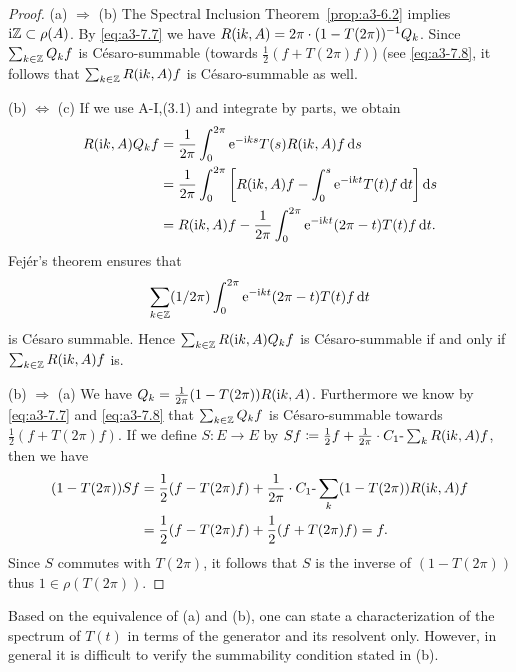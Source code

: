 \begin{proof}
(a) $\Rightarrow$ (b) The Spectral Inclusion Theorem~\ref{prop:a3-6.2} implies $\mathrm{i}\mathbb{Z} \subset \rho(A)$.
By \eqref{eq:a3-7.7} we have $R(\mathrm{i} k,A) = 2\pi\cdot(1-T(2\pi))^{-1}Q_{k}$.
Since $\sum_{k\in\mathbb{Z}} Q_{k}f$ is Césaro-summable (towards $\frac{1}{2}(f + T(2\pi)f)$) (see \eqref{eq:a3-7.8}, it follows that $\sum_{k\in\mathbb{Z}} R(\mathrm{i} k,A)f$ is Césaro-summable as well.

(b) $\Leftrightarrow$ (c) If we use A-I,(3.1) and integrate by parts, we obtain
\begin{align*}
R(\mathrm{i} k,A)Q_{k}f &= \frac{1}{2\pi}\int_{0}^{2\pi} \mathrm{e}^{-\mathrm{i} ks} T(s)R(\mathrm{i} k,A)f \mathop{}\!\mathrm{d}{s} \\
&= \frac{1}{2\pi}\int_{0}^{2\pi} \left[R(\mathrm{i} k,A)f - \int_{0}^{s} \mathrm{e}^{-\mathrm{i} kt} T(t)f \mathop{}\!\mathrm{d}{t}\right] \mathop{}\!\mathrm{d}{s} \\
&= R(\mathrm{i} k,A)f - \frac{1}{2\pi}\int_{0}^{2\pi} \mathrm{e}^{-\mathrm{i} kt} (2\pi-t) T(t)f \mathop{}\!\mathrm{d}{t} .
\end{align*}
Fejér's theorem ensures that 
%
\[
	 \sum_{k\in\mathbb{Z}} (1/2\pi)\int_{0}^{2\pi} \mathrm{e}^{-\mathrm{i} kt} (2\pi-t) T(t)f \mathop{}\!\mathrm{d}{t} 
\]
%
is Césaro summable.
Hence $\sum_{k\in\mathbb{Z}} R(\mathrm{i} k,A)Q_{k}f$ is Césaro-summable if and only if $\sum_{k\in\mathbb{Z}} R(\mathrm{i} k,A)f$ is.

(b) $\Rightarrow$ (a) We have $Q_{k} = \frac{1}{2\pi}(1 - T(2\pi))R(\mathrm{i} k,A)$.
Furthermore we know by \eqref{eq:a3-7.7} and \eqref{eq:a3-7.8} that $\sum_{k\in\mathbb{Z}} Q_{k}f$ is Césaro-summable towards $\frac{1}{2}(f + T(2\pi)f)$.
If we define $S \colon E \to E$ by $Sf \coloneqq \frac{1}{2}f + \frac{1}{2\pi}\cdot C_{1}\text{-}\sum_k R(\mathrm{i} k,A)f$, then we have
\begin{align*}
(1 - T(2\pi))Sf &= \frac{1}{2}(f - T(2\pi)f) + \frac{1}{2\pi}\cdot C_{1}\text{-}\sum_k (1 - T(2\pi))R(\mathrm{i} k,A)f \\
&= \frac{1}{2}(f - T(2\pi)f) + \frac{1}{2}(f + T(2\pi)f) = f .
\end{align*}
Since $S$ commutes with $T(2\pi)$, it follows that $S$ is the inverse of $(1 - T(2\pi))$ thus $1 \in \rho(T(2\pi))$.
\end{proof}
Based on the equivalence of (a) and (b), one can state a characterization of the spectrum of $T(t)$ in terms of the generator and its resolvent only.
However, in general it is difficult to verify the summability condition stated in (b).

